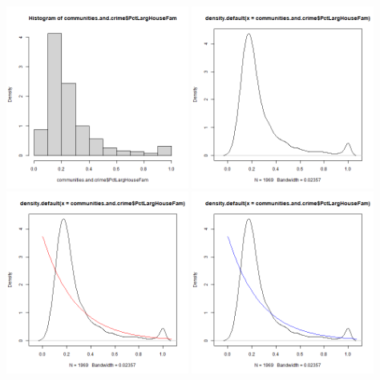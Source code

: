 \documentclass[12pt, letterpaper]{report}
\begin{document}
\begin{center}
\includegraphics[width=0.45\textwidth]{exponential/PctLargHouseFam_hist}
\includegraphics[width=0.45\textwidth]{exponential/PctLargHouseFam_density}
\includegraphics[width=0.45\textwidth]{exponential/PctLargHouseFam_mle}
\includegraphics[width=0.45\textwidth]{exponential/PctLargHouseFam_mm}
\end{center}
\end{document}
